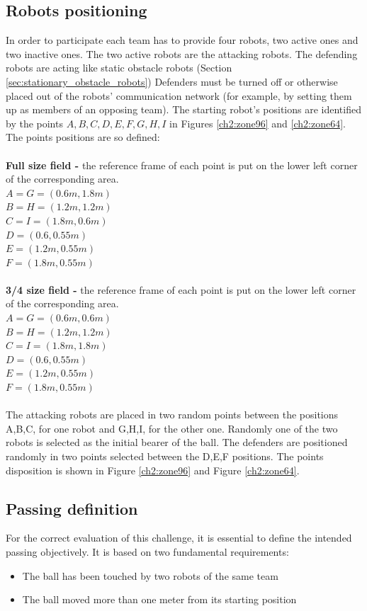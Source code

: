 \subsection{Robots positioning}
In order to participate each team has to provide four robots, two active ones and two inactive ones. The two active robots are the attacking robots. The defending robots are acting like static obstacle robots (\cf Section \ref{sec:stationary_obstacle_robots})
Defenders must be turned off or otherwise placed out of the robots' communication network (for example, by setting them up as members of an opposing team).
The starting robot's positions are identified by the points ${A,B,C,D,E,F,G,H,I}$ in Figures \ref{ch2:zone96} and \ref{ch2:zone64}.
The points positions are so defined:
\\
\\
\textbf{Full size field -} the reference frame of each point is put on the lower left corner of the corresponding area.
\\
$A = G = (0.6m, 1.8m)$
\\
$B = H = (1.2m, 1.2m)$
\\
$C = I = (1.8m, 0.6m)$
\\
$D = (0.6, 0.55m)$
\\
$E = (1.2m, 0.55m)$
\\
$F = (1.8m, 0.55m)$
\\
\\
\textbf{3/4 size field -} the reference frame of each point is put on the lower left corner of the corresponding area.
\\
$A = G = (0.6m, 0.6m)$
\\
$B = H = (1.2m, 1.2m)$
\\
$C = I = (1.8m, 1.8m)$
\\
$D = (0.6, 0.55m)$
\\
$E = (1.2m, 0.55m)$
\\
$F = (1.8m, 0.55m)$
\\
\\
The attacking robots are placed in two random points between the positions A,B,C, for one robot and G,H,I, for the other one.  Randomly one of the two robots is selected as the initial bearer of the ball. The defenders are positioned randomly in two points selected between the D,E,F positions.
The points disposition is shown in Figure \ref{ch2:zone96} and Figure \ref{ch2:zone64}.

\subsection{Passing definition}
For the correct evaluation of this challenge, it is essential to define the intended passing objectively. It is based on two fundamental requirements:
\begin{itemize}
    \item The ball has been touched by two robots of the same team
    \item The ball moved more than one meter from its starting position
\end{itemize}


